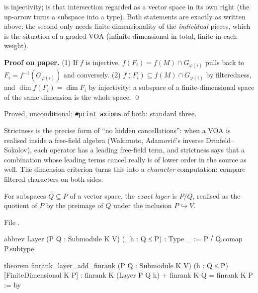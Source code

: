 \begin{dictionary}
 is injectivity; \allowbreak{}\allowbreak{} is that
intersection regarded as a vector space in its own right (the up-arrow  turns a subspace into a
type). Both statements are exactly as written above; the second only needs finite-dimensionality of the
\emph{individual} pieces, which is the situation of a graded VOA (infinite-dimensional in total, finite
in each weight).
\end{dictionary}

\textbf{Proof on paper.} (1) If $f$ is injective, $f(F_i) = f(M)\cap G_{\varphi(i)}$ pulls back to
$F_i = f^{-1}(G_{\varphi(i)})$ and conversely. (2) $f(F_i)\subseteq f(M)\cap G_{\varphi(i)}$ by
filteredness, and $\dim f(F_i) = \dim F_i$ by injectivity; a subspace of a finite-dimensional space of
the same dimension is the whole space. \qed

\begin{status}
Proved, unconditional; \texttt{\#print axioms} of both: standard three.
\end{status}

\begin{physics}
Strictness is the precise form of ``no hidden cancellations'': when a VOA is realised inside a
free-field algebra (Wakimoto, Adamovi\'c's inverse Drinfeld--Sokolov), each operator has a leading
free-field term, and strictness says that a combination whose leading terms cancel really is of lower
order in the source as well. The dimension criterion turns this into a \emph{character} computation:
compare filtered characters on both sides.
\end{physics}

\begin{definition}\label{l11:def:layer}
For subspaces $Q\subseteq P$ of a vector space, the \emph{exact layer} is $P/Q$, realised as the quotient
of $P$ by the preimage of $Q$ under the inclusion $P\hookrightarrow V$.
\end{definition}
\noindent File .
\begin{leancode}
abbrev Layer (P Q : Submodule K V) (_h : Q ≤ P) : Type _ :=
  P ⧸ Q.comap P.subtype

theorem finrank_layer_add_finrank
    (P Q : Submodule K V) (h : Q ≤ P) [FiniteDimensional K P] :
  finrank K (Layer P Q h) + finrank K Q = finrank K P := by
\end{leancode}

